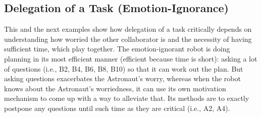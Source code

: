 \subsection{Delegation of a Task (Emotion-Ignorance)}

This and the next examples show how delegation of a task critically depends on
understanding how worried the other collaborator is and the necessity of having
sufficient time, which play together. The emotion-ignorant robot is doing
planning in its most efficient manner (efficient because time is short): asking
a lot of questions (i.e., B2, B4, B6, B8, B10) so that it can work out the plan.
But asking questions exacerbates the Astronaut's worry, whereas when the robot
knows about the Astronaut's worriedness, it can use its own motivation mechanism
to come up with a way to alleviate that. Its methods are to exactly postpone any
questions until such time as they are critical (i.e., A2, A4).

